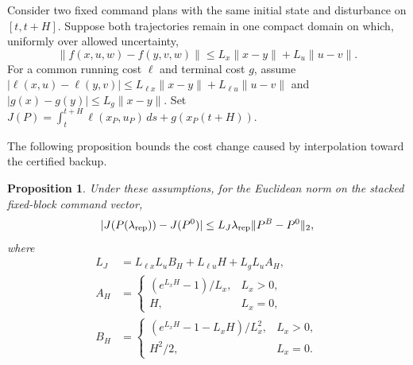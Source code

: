 \documentclass[preprint,12pt]{elsarticle}
\newtheorem{proposition}{Proposition}
\begin{document}
Consider two fixed command plans with the same initial state and
disturbance on $[t,t+H]$. Suppose both trajectories remain in one compact
domain on which, uniformly over allowed uncertainty,
\[
\|f(x,u,w)-f(y,v,w)\|
\le L_x\|x-y\|+L_u\|u-v\|.
\]
For a common running cost $\ell$ and terminal cost $g$, assume
$|\ell(x,u)-\ell(y,v)|\le L_{\ell x}\|x-y\|+
L_{\ell u}\|u-v\|$ and $|g(x)-g(y)|\le L_g\|x-y\|$.
Set $J(P)=\int_t^{t+H}\ell(x_P,u_P)\,ds+g(x_P(t+H))$.

The following proposition bounds the cost change caused by interpolation
toward the certified backup.

\begin{proposition}
\label{prop:repair-cost}
Under these assumptions, for the Euclidean norm on the stacked fixed-block
command vector,
\begin{equation}
|J(P(\lambda_{\rm rep}))-J(P^0)|
\le L_J\lambda_{\rm rep}\|P^B-P^0\|_2,
\label{eq:repair-cost-bound}
\end{equation}
where
\begin{align*}
L_J&=L_{\ell x}L_u B_H+L_{\ell u}H+L_gL_u A_H,\\
A_H&=\begin{cases}(e^{L_xH}-1)/L_x,&L_x>0,\\H,&L_x=0,\end{cases}\\
B_H&=\begin{cases}(e^{L_xH}-1-L_xH)/L_x^2,&L_x>0,\\H^2/2,&L_x=0.\end{cases}
\end{align*}
\end{proposition}
\end{document}

